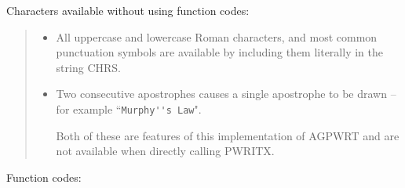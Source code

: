\documentclass[twoside,11pt]{article}
\renewcommand{\_}{\texttt{\symbol{95}}}
\begin{document}
Characters available without using function codes:

\begin{quote}
\begin{itemize}
\item All uppercase and lowercase Roman characters, and most common
punctuation symbols are available by including them literally
in the string CHRS.
\item Two consecutive apostrophes causes a single apostrophe to be
drawn -- for example ``\verb+Murphy''s Law+".

Both of these are features of this implementation of AGPWRT and
are not available when directly calling PWRITX.
\end{itemize}
\end{quote}

Function codes:
\end{document}
